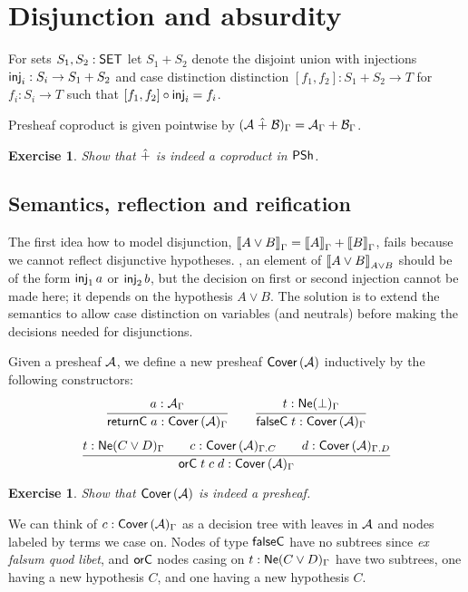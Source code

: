 \documentclass[a4paper]{article}
\newtheorem{exercise}[theorem]{Exercise}
\begin{document}
\section{Disjunction and absurdity}

For sets $S_1,S_2 : \mathsf{SET}$ let $S_1 + S_2$ denote the disjoint union with
injections $\mathsf{inj}_{i} : S_i \to S_1 + S_2$ and case distinction
distinction $[f_1,f_2] : S_1 + S_2 \to T$ for $f_i : S_i \to T$
such that $[f_1,f_2] \circ \mathsf{inj}_{i} = f_i$.

Presheaf coproduct is given pointwise by $(\mathcal{A} \mathrel{\hat{+}} \mathcal{B})_\Gamma = \mathcal{A}_\Gamma + \mathcal{B}_\Gamma$.
\begin{exercise}
  Show that $\mathrel{\hat{+}}$ is indeed a coproduct in $\mathsf{PSh}$.
\end{exercise}


\subsection{Semantics, reflection and reification}

The first idea how to model disjunction,
$\mathopen{{[\kern-0.14em[}} A \lor B \mathclose{{]\kern-0.14em]}}_\Gamma = \mathopen{{[\kern-0.14em[}} A \mathclose{{]\kern-0.14em]}}_\Gamma + \mathopen{{[\kern-0.14em[}} B \mathclose{{]\kern-0.14em]}}_\Gamma$, fails
because we cannot reflect disjunctive hypotheses.  \Eg, an element of
$\mathopen{{[\kern-0.14em[}} A \lor B \mathclose{{]\kern-0.14em]}}_{A \lor B}$ should be of the form $\mathsf{inj}_{1}\,a$ or
$\mathsf{inj}_{2}\,b$, but the decision on first or second injection cannot be
made here;  it depends on the hypothesis $A \lor B$.  The solution is
to extend the semantics to allow case distinction on variables (and
neutrals) before making the decisions needed for disjunctions.

Given a presheaf $\mathcal{A}$, we define a new presheaf $\mathsf{Cover}\,(\mathcal{A})$
inductively by the following constructors:
\begin{gather*}
  \ru{a : \A_\Gamma}{\returnC a : \Cover\A_\Gamma}
\qquad
  \ru{t : \NeG \bot}{\falseC t : \Cover\A_\Gamma}
\\[1ex]
  \ru{t : \NeG{C \lor D} \qquad
      c : \Cover\A_{\Gamma.C} \qquad
      d : \Cover\A_{\Gamma.D}
    }{\orC t c d : \Cover\A_\Gamma}
\end{gather*}
\begin{exercise}
  Show that $\mathsf{Cover}\,(\mathcal{A})$ is indeed a presheaf.
\end{exercise}
We can think of $c : \mathsf{Cover}\,(\mathcal{A})_\Gamma$ as a decision tree with leaves in $\mathcal{A}$
and nodes labeled by terms we case on.  Nodes of type $\mathsf{falseC}$ have
no subtrees since \emph{ex falsum quod libet}, and $\mathsf{orC}$ nodes
casing on $t : \mathsf{Ne}(C \lor D)_{\Gamma}$ have
two subtrees, one having a new hypothesis $C$, and one having a new
hypothesis $C$.
\end{document}
